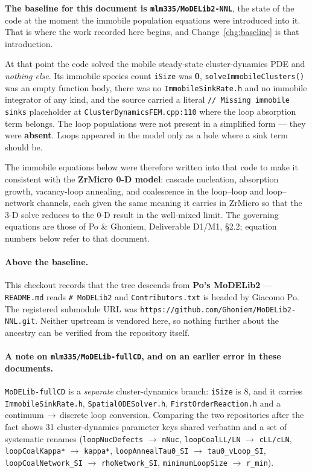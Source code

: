 \documentclass[11pt,a4paper]{article}
\newcommand{\code}[1]{\texttt{\small #1}}
\newcounter{chg}
\begin{document}
\textbf{The baseline for this document is
\code{mlm335/MoDELib2-NNL}}, the state of the code at the moment the immobile
population equations were introduced into it. That is where the work recorded
here begins, and Change~\ref{chg:baseline} is that introduction.

At that point the code solved the mobile steady-state cluster-dynamics PDE and
\emph{nothing else}. Its immobile species count \code{iSize} was \textbf{0},
\code{solveImmobileClusters()} was an empty function body, there was no
\code{ImmobileSinkRate.h} and no immobile integrator of any kind, and the
source carried a literal \code{// Missing immobile sinks} placeholder at
\code{ClusterDynamicsFEM.cpp:110} where the loop absorption term belongs. The
loop populations were not present in a simplified form --- they were
\textbf{absent}. Loops appeared in the model only as a hole where a sink term
should be.

The immobile equations below were therefore written into that code to make it
consistent with the \textbf{ZrMicro 0-D model}: cascade nucleation, absorption
growth, vacancy-loop annealing, and coalescence in the loop--loop and
loop--network channels, each given the same meaning it carries in ZrMicro so
that the 3-D solve reduces to the 0-D result in the well-mixed limit. The
governing equations are those of Po \& Ghoniem, Deliverable D1/M1, \S2.2;
equation numbers below refer to that document.

\paragraph{Above the baseline.} This checkout records that the tree descends
from \textbf{Po's MoDELib2} --- \code{README.md} reads \code{\# MoDELib2} and
\code{Contributors.txt} is headed by Giacomo Po. The registered submodule URL
was \code{https://github.com/Ghoniem/MoDELib2-NNL.git}. Neither upstream is
vendored here, so nothing further about the ancestry can be verified from the
repository itself.

\paragraph{A note on \code{mlm335/MoDELib-fullCD}, and on an earlier error in
these documents.} \code{MoDELib-fullCD} is a \emph{separate} cluster-dynamics
branch: \code{iSize} is 8, and it carries \code{ImmobileSinkRate.h},
\code{SpatialODESolver.h}, \code{FirstOrderReaction.h} and a
continuum\,$\rightarrow$\,discrete loop conversion. Comparing the two
repositories after the fact shows 31 cluster-dynamics parameter keys shared
verbatim and a set of systematic renames (\code{loopNucDefects} $\rightarrow$
\code{nNuc}, \code{loopCoalLL/LN} $\rightarrow$ \code{cLL/cLN},
\code{loopCoalKappa*} $\rightarrow$ \code{kappa*}, \code{loopAnnealTau0\_SI}
$\rightarrow$ \code{tau0\_vLoop\_SI}, \code{loopCoalNetwork\_SI} $\rightarrow$
\code{rhoNetwork\_SI}, \code{minimumLoopSize} $\rightarrow$ \code{r\_min}).
\end{document}
